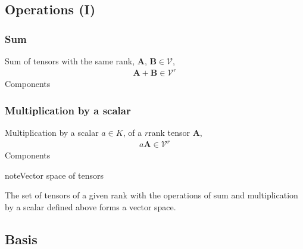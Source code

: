 \documentclass[letterpaper,10pt,english]{jupyterBook}
\begin{document}
\subsection{Operations (I)}
\label{\detokenize{ch/tensor-algebra-calculus/algebra:id3}}

\subsubsection{Sum}
\label{\detokenize{ch/tensor-algebra-calculus/algebra:id4}}
\sphinxAtStartPar
Sum of tensors with the same rank, \(\mathbf{A}\), \(\mathbf{B} \in \mathscr{V}\),
\begin{equation*}
\begin{split}\mathbf{A} + \mathbf{B} \in \mathscr{V}^r\end{split}
\end{equation*}
\sphinxAtStartPar
{} Components


\subsubsection{Multiplication by a scalar}
\label{\detokenize{ch/tensor-algebra-calculus/algebra:id5}}
\sphinxAtStartPar
Multiplication by a scalar \(a \in K\), of a \(r\)\sphinxhyphen{}rank tensor \(\mathbf{A}\),
\begin{equation*}
\begin{split}a \mathbf{A} \in \mathscr{V}^r\end{split}
\end{equation*}
\sphinxAtStartPar
{} Components

\begin{sphinxadmonition}{note}{Vector space of tensors}

\sphinxAtStartPar
The set of tensors of a given rank with the operations of sum and multiplication by a scalar defined above forms a vector space.
\end{sphinxadmonition}


\subsection{Basis}
\label{\detokenize{ch/tensor-algebra-calculus/algebra:basis}}
\end{document}

